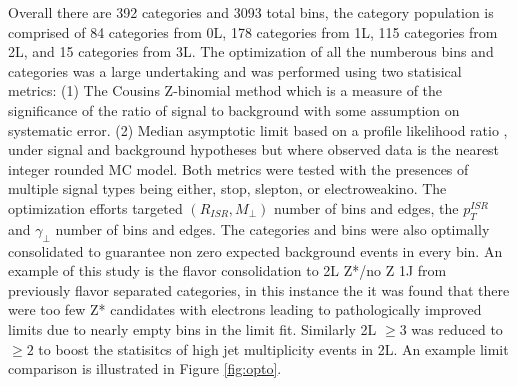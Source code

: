 Overall there are 392 categories and 3093 total bins, the category population is comprised of 84 categories from 0L, 178 categories from 1L, 115 categories from 2L, and 15 categories from 3L. The optimization of all the numberous bins and categories was a large undertaking and was performed using two statisical metrics: (1) The Cousins Z-binomial method \cite{Cousins_2008} which is a measure of the significance of the ratio of signal to background with some assumption on systematic error. (2)  Median asymptotic limit based on a profile likelihood ratio \cite{Cowan:2010js}, under signal and background hypotheses but where observed data is the nearest integer rounded MC model. Both metrics were tested with the presences of multiple signal types being either, stop, slepton, or electroweakino. The optimization efforts targeted $(R_{ISR}, M_\perp)$ number of bins and edges, the $p_T^{ISR}$ and $\gamma_\perp$ number of bins and edges. The categories and bins were also optimally consolidated to guarantee non zero expected background events in every bin. An example of this study is the flavor consolidation to 2L Z*/no Z 1J from previously flavor separated categories, in this instance the it was found that there were too few Z* candidates with electrons leading to pathologically improved limits due to nearly empty bins in the limit fit. Similarly 2L $\geq 3$ was reduced to $\geq 2$ to boost the statisitcs of high jet multiplicity events in 2L. An example limit comparison is illustrated in Figure \ref{fig:opto}.

